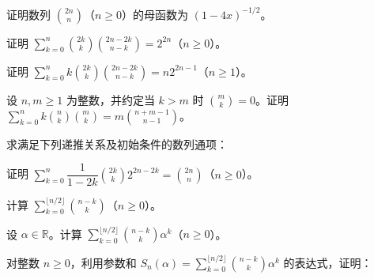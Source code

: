 \noindent\begin{minipage}{\textwidth}
证明数列 $\binom{2n}n$（$n\ge0$）的母函数为 $(1-4x)^{-1/2}$。
\end{minipage}\par\vfill
\noindent\begin{minipage}{\textwidth}
证明 $\sum_{k=0}^n\binom{2k}k\binom{2n-2k}{n-k}=2^{2n}$（$n\ge0$）。
\end{minipage}\par\vfill
\newpage
\noindent\begin{minipage}{\textwidth}
证明 $\sum_{k=0}^nk\binom{2k}k\binom{2n-2k}{n-k}=n2^{2n-1}$（$n\ge1$）。
\end{minipage}\par\vfill
\noindent\begin{minipage}{\textwidth}
设 $n,m\ge1$ 为整数，并约定当 $k>m$ 时 $\binom mk=0$。证明 $\sum_{k=0}^nk\binom nk\binom mk=m\binom{n+m-1}{n-1}$。
\end{minipage}\par\vfill
\noindent\begin{minipage}{\textwidth}
求满足下列递推关系及初始条件的数列通项：
\end{minipage}\par\vfill
\newpage
\noindent\begin{minipage}{\textwidth}
证明 $\sum_{k=0}^n\dfrac1{1-2k}\binom{2k}k2^{2n-2k}=\binom{2n}n$（$n\ge0$）。
\end{minipage}\par\vfill
\noindent\begin{minipage}{\textwidth}
计算 $\sum_{k=0}^{\lfloor n/2\rfloor}\binom{n-k}k$（$n\ge0$）。
\end{minipage}\par\vfill
\noindent\begin{minipage}{\textwidth}
设 $\alpha\in\mathbb R$。计算 $\sum_{k=0}^{\lfloor n/2\rfloor}\binom{n-k}k\alpha^k$（$n\ge0$）。
\end{minipage}\par\vfill
\newpage
\noindent\begin{minipage}{\textwidth}
对整数 $n\ge0$，利用参数和 $S_n(\alpha)=\sum_{k=0}^{\lfloor n/2\rfloor}\binom{n-k}k\alpha^k$ 的表达式，证明：
\end{minipage}\par\vfill
